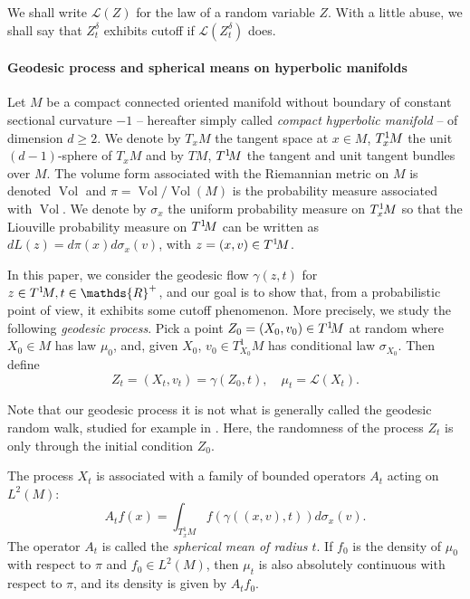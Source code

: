 \documentclass[]{scrartcl}
\newcommand{\DTV}{\mathrm{d_{TV}}}
\newcommand{\cL}{\mathcal L}
\newcommand{\R}{\mathds{R}}
\newcommand{\Rp}{\R^{+}}
\DeclareMathOperator{\Vol}{Vol}
\numberwithin{equation}{section}
\numberwithin{figure}{section}
\begin{document}
 We shall write $\cL(Z)$ for the law of a random variable $Z$. With a little abuse, we shall say that $Z_t^\delta$ exhibits cutoff if $\cL(Z_t^\delta)$ does. %


\paragraph{Geodesic process and spherical means on hyperbolic manifolds}
Let $M$ be a compact connected {oriented} manifold without boundary of constant sectional curvature $-1$ -- hereafter simply called {\em compact  hyperbolic manifold} --  of dimension $d \geq 2$.  We denote by  $T_x M$ the tangent space at $x \in M$, $T^1_x\hspace{-1pt}M$ the unit $(d-1)$-sphere of $T_x M$ and by $TM$, $T^1\hspace{-2pt}M$ the tangent and unit tangent bundles over $M$. The volume form associated with the Riemannian metric on $M$ is denoted $\Vol$ and $\pi = \Vol / \Vol(M)$ is the probability measure associated with $\Vol$. We denote by $\sigma_x$ the uniform probability measure on $T^1_x\hspace{-1pt}M$ so that the Liouville probability measure on $T^1\hspace{-2pt}M$ can be written as $d L (z)  = d\pi(x) d\sigma_x(v)$, with $z = (x,v) \in  T^1\hspace{-2pt}M$.

In this paper, we consider the geodesic flow $\gamma(z, t)$ for $z \in T^1\hspace{-2pt}M, t \in \Rp$,  and our goal is to show that, from a probabilistic point of view, it exhibits some cutoff phenomenon. More precisely, we study the following {\em geodesic process}. Pick a point $Z_0 = (X_0,v_0) \in T^1\hspace{-2pt}M$ at random where $X_0 \in M$ has law $\mu_0$, and, given $X_0$,  $v_0 \in T^1_{X_0}M$ has conditional law $\sigma_{X_0}$. Then define \[Z_t = (X_t,v_t) = \gamma (Z_0,t), \quad \mu_t = \mathcal{L}(X_t).\] 

Note that our geodesic process it is not what is generally called the geodesic random walk, studied for example in \cite{MR758647,Golubev}. Here, the randomness of the process $Z_t$ is only through the initial condition $Z_0$. 
		
			
The process $X_t$ is associated with a family of bounded operators $A_t$ acting on $L^2(M)$: 
\[A_tf(x) = \int_{T^1_xM} f(\gamma((x,v),t)) d\sigma_x(v).\]
The operator $A_t$ is called the {\em spherical mean of radius $t$}. If $f_0$ is the density of $\mu_0$ with respect to $\pi$ and $f_0 \in L^2(M)$, then $\mu_t$ is also absolutely continuous with respect to $\pi$, and its density is given by $A_tf_0$. 			
			
\end{document}
